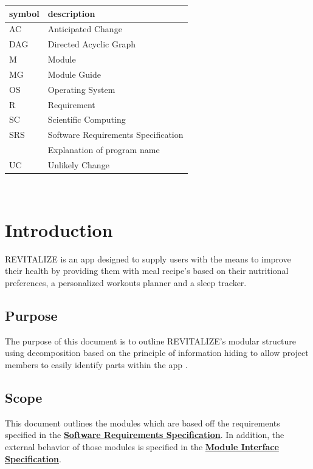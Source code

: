 \documentclass[12pt, titlepage]{article}
\begin{document}
\renewcommand{\arraystretch}{1.2}
\begin{tabular}{l l} 
	\toprule		
	\textbf{symbol} & \textbf{description}\\
	\midrule 
	AC & Anticipated Change\\
	DAG & Directed Acyclic Graph \\
	M & Module \\
	MG & Module Guide \\
	OS & Operating System \\
	R & Requirement\\
	SC & Scientific Computing \\
	SRS & Software Requirements Specification\\
	\progname & Explanation of program name\\
	UC & Unlikely Change \\
	\bottomrule
\end{tabular}\\

\newpage

\tableofcontents

\listoftables

\listoffigures

\newpage


\section{Introduction}
REVITALIZE is an app designed to supply users with the means to improve their health by providing them with meal recipe's based on their nutritional preferences, a personalized workouts planner and a sleep tracker.  

\subsection{Purpose}
The purpose of this document is to outline REVITALIZE's modular structure using decomposition based on the principle of information hiding to allow project members to easily identify parts within the app \citep{Parnas1972a}.

\subsection{Scope}
This document outlines the modules which are based off the requirements specified
in the \href{https://github.com/BillNguyen1999/REVITALIZE/blob/main/docs/SRS/SRS.pdf}{\textbf{Software Requirements Specification}}. In addition, the external behavior of those modules is specified in the \href{https://github.com/BillNguyen1999/REVITALIZE/blob/main/docs/Design/SoftDetailedDes/MIS.pdf}{\textbf{Module Interface Specification}}.
\end{document}
